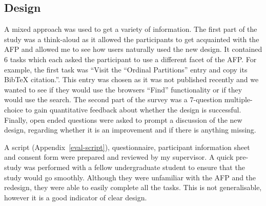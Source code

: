 \documentclass[bsc,frontabs,oneside,singlespacing,parskip,deptreport,logo]{infthesis}
\begin{document}
\subsection{Design}

A mixed approach was used to get a variety of information. The first part of the study was a think-aloud as it allowed the participants to get acquainted with the AFP and allowed me to see how users naturally used the new design. It contained 6 tasks which each asked the participant to use a different facet of the AFP. For example, the first task was ``Visit the ``Ordinal Partitions'' entry and copy its BibTeX citation.''. This entry was chosen as it was not published recently and we wanted to see if they would use the browsers ``Find'' functionality or if they would use the search. The second part of the survey was a 7-question multiple-choice to gain quantitative feedback about whether the design is successful. Finally, open ended questions were asked to prompt a discussion of the new design, regarding whether it is an improvement and if there is anything missing.



A script (Appendix~\ref{eval-script}), questionnaire, participant information sheet and consent form were prepared and reviewed by my supervisor. A quick pre-study was performed with a fellow undergraduate student to ensure that the study would go smoothly. Although they were unfamiliar with the AFP and the redesign, they were able to easily complete all the tasks. This is not generalisable, however it is a good indicator of clear design. %

\end{document}
